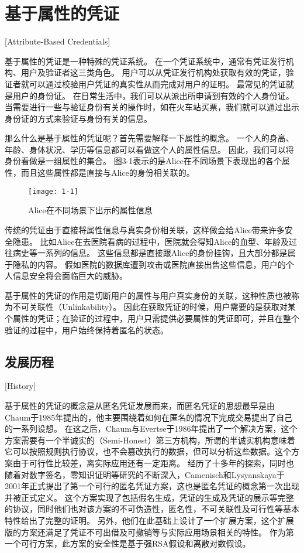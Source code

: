 

\chapter{基于属性的凭证}[Attribute-Based Credentials]

基于属性的凭证是一种特殊的凭证系统。
在一个凭证系统中，通常有凭证发行机构、用户及验证者这三类角色。
用户可以从凭证发行机构处获取有效的凭证，验证者就可以通过校验用户凭证的真实性从而完成对用户的证明。
最常见的凭证就是用户的身份证。
在日常生活中，我们可以从派出所申请到有效的个人身份证。
当需要进行一些与验证身份有关的操作时，如在火车站买票，我们就可以通过出示身份证的方式来验证与身份有关的信息。

那么什么是基于属性的凭证呢？首先需要解释一下属性的概念。
一个人的身高、年龄、身体状况、学历等信息都可以看做这个人的属性信息。
因此，我们可以将身份看做是一组属性的集合。
图3-1表示的是Alice在不同场景下表现出的各个属性，而且这些属性都是直接与Alice的身份相关联的。

\begin{figure}[h]
\centering
\texttt{[image: 1-1]}
\caption{Alice在不同场景下出示的属性信息}
\end{figure}

传统的凭证由于直接将属性信息与真实身份相关联，这样做会给Alice带来许多安全隐患。
比如Alice在去医院看病的过程中，医院就会得知Alice的血型、年龄及过往病史等一系列的信息。
这些信息都是直接跟Alice的身份挂钩，且大部分都是属于隐私的内容。
假如医院的数据库遭到攻击或医院直接出售这些信息，用户的个人信息安全将会面临巨大的威胁。

基于属性的凭证的作用是切断用户的属性与用户真实身份的关联，这种性质也被称为不可关联性（Unlinkability）。
因此在获取凭证的时候，用户需要的是获取对某个属性的凭证；在验证的过程中，用户只需提供必要属性的凭证即可，并且在整个验证的过程中，用户始终保持着匿名的状态。

\section{发展历程}[History]

基于属性的凭证的概念是从匿名凭证发展而来，而匿名凭证的思想最早是由Chaum\cite{chaum1985security}于1985年提出的，他主要围绕着如何在匿名的情况下完成交易提出了自己的一系列设想。
在这之后，Chaum与Evertse于1986年提出了一个解决方案\cite{chaum1986secure}，这个方案需要有一个半诚实的（Semi-Honest）第三方机构\cite{张严2012匿名凭证方案研究进展,camenisch2001efficient}，所谓的半诚实机构意味着它可以按照规则执行协议，也不会篡改执行的数据，但可以分析这些数据。这个方案由于可行性比较差，离实际应用还有一定距离。
经历了十多年的探索，同时也随着对数字签名，零知识证明等研究的不断深入，Camenisch和Lysyanskaya于2001年正式提出了第一个可行的匿名凭证方案\cite{camenisch2001efficient}，这也是匿名凭证的概念第一次出现并被正式定义。
这个方案实现了包括假名生成，凭证的生成及凭证的展示等完整的协议，同时他们也对该方案的不可伪造性，匿名性，不可关联性及可行性等基本特性给出了完整的证明。
另外，他们在此基础上设计了一个扩展方案，这个扩展版的方案还满足了凭证不可出借及可撤销等与实际应用场景相关的特性。
作为第一个可行方案，此方案的安全性是基于强RSA假设和离散对数假设。

